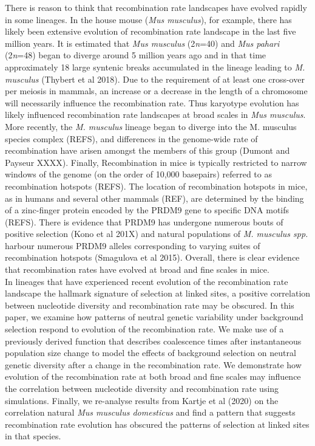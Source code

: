 \documentclass[11pt,twoside,lineno]{GSA_format}
\begin{document}
There is reason to think that recombination rate landscapes have evolved rapidly in some lineages. In the house mouse (\textit{Mus musculus}), for example, there has likely been extensive evolution of recombination rate landscape in the last five million years. It is estimated that \textit{Mus musculus} (2\textit{n}=40) and \textit{Mus pahari} (2\textit{n}=48) began to diverge around 5 million years ago and in that time approximately 18 large syntenic breaks accumulated in the lineage leading to \textit{M. musculus} (Thybert et al 2018). Due to the requirement of at least one cross-over per meiosis in mammals, an increase or a decrease in the length of a chromosome will necessarily influence the recombination rate. Thus karyotype evolution has likely influenced recombination rate landscapes at broad scales in \textit{Mus musculus}. More recently, the \textit{M. musculus} lineage began to diverge into the M. musculus species complex (REFS), and differences in the genome-wide rate of recombination have arisen amongst the members of this group (Dumont and Payseur XXXX). Finally, Recombination in mice is typically restricted to narrow windows  of the genome (on the order of 10,000 basepairs) referred to as recombination hotspots (REFS). The location of recombination hotspots in mice, as in humans and several other mammals (REF), are determined by the binding of a zinc-finger protein encoded by the PRDM9 gene to specific DNA motifs (REFS). There is evidence that PRDM9 has undergone numerous bouts of positive selection (Kono et al 201X) and natural populations of \textit{M. musculus spp.} harbour numerous PRDM9 alleles corresponding to varying suites of recombination hotspots  (Smagulova et al 2015). Overall, there is clear evidence that recombination rates have evolved at broad and fine scales in mice. \\

In lineages that have experienced recent evolution of the recombination rate landscape the hallmark signature of selection at linked sites, a positive correlation between nucleotide diversity and recombination rate may be obscured. In this paper, we examine how patterns of neutral genetic variability under background selection respond to evolution of the recombination rate. We make use of a previously derived function that describes coalescence times after instantaneous population size change to model the effects of background selection on neutral genetic diversity after a change in the recombination rate. We demonstrate how evolution of the recombination rate at both broad and fine scales may influence the correlation between nucleotide diversity and recombination rate using simulations. Finally, we re-analyse results from Kartje et al (2020) on the correlation natural \textit{Mus musculus domesticus} and find a pattern that suggests recombination rate evolution has obscured the patterns of selection at linked sites in that species.
\end{document}

